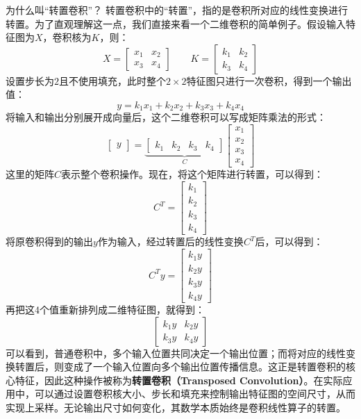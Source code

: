 \begin{orangeBox}{为什么叫“转置卷积”？}
转置卷积中的“转置”，指的是卷积所对应的线性变换进行转置。为了直观理解这一点，我们直接来看一个二维卷积的简单例子。假设输入特征图为$X$，卷积核为$K$，则：
$$
X=\begin{bmatrix}x_1 & x_2\\ x_3 & x_4\end{bmatrix}\qquad K=\begin{bmatrix}k_1 & k_2\\ k_3 & k_4\end{bmatrix}
$$
设置步长为$2$且不使用填充，此时整个$2\times2$特征图只进行一次卷积，得到一个输出值：
$$
y=k_1x_1+k_2x_2+k_3x_3+k_4x_4
$$
将输入和输出分别展开成向量后，这个二维卷积可以写成矩阵乘法的形式：
$$
\begin{bmatrix}y\end{bmatrix} =
\underbrace{
\begin{bmatrix} k_1 & k_2 & k_3 & k_4 \end{bmatrix}}_{C}
\begin{bmatrix}
x_1 \\ x_2 \\ x_3 \\ x_4
\end{bmatrix}
$$
这里的矩阵$C$表示整个卷积操作。现在，将这个矩阵进行转置，可以得到：
$$
C^T=\begin{bmatrix} k_1\\ k_2\\ k_3\\ k_4 \end{bmatrix}
$$
将原卷积得到的输出$y$作为输入，经过转置后的线性变换$C^T$后，可以得到：
$$
C^Ty=\begin{bmatrix} k_1y\\ k_2y\\ k_3y\\ k_4y \end{bmatrix}
$$
再把这4个值重新排列成二维特征图，就得到：
$$
\begin{bmatrix}
k_1y & k_2y\\
k_3y & k_4y
\end{bmatrix}
$$
可以看到，普通卷积中，多个输入位置共同决定一个输出位置；而将对应的线性变换转置后，则变成了一个输入位置向多个输出位置传播信息。这正是转置卷积的核心特征，因此这种操作被称为\textbf{转置卷积（Transposed Convolution）}。在实际应用中，可以通过设置卷积核大小、步长和填充来控制输出特征图的空间尺寸，从而实现上采样。无论输出尺寸如何变化，其数学本质始终是卷积线性算子的转置。
\end{orangeBox}

